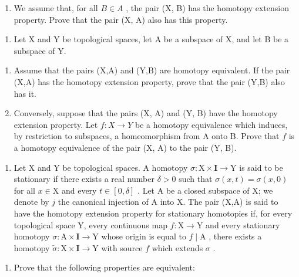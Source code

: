 \begin{enumerate}
\def\labelenumi{\alph{enumi})}
\setcounter{enumi}{1}
\tightlist
\item
  We assume that, for all \(B \in A\) , the pair (X, B) has the homotopy extension property. Prove that the pair (X, A) also has this property.
\end{enumerate}

\begin{enumerate}
\def\labelenumi{\arabic{enumi})}
\setcounter{enumi}{21}
\tightlist
\item
  Let X and Y be topological spaces, let A be a subspace of X, and let B be a subspace of Y.
\end{enumerate}

\begin{enumerate}
\def\labelenumi{\alph{enumi})}
\item
  Assume that the pairs (X,A) and (Y,B) are homotopy equivalent. If the pair (X,A) has the homotopy extension property, prove that the pair (Y,B) also has it.
\item
  Conversely, suppose that the pairs (X, A) and (Y, B) have the homotopy extension property. Let \(f \colon X \to Y\) be a homotopy equivalence which induces, by restriction to subspaces, a homeomorphism from A onto B. Prove that \(f\) is a homotopy equivalence of the pair (X, A) to the pair (Y, B).
\end{enumerate}

\begin{enumerate}
\def\labelenumi{\arabic{enumi})}
\setcounter{enumi}{22}
\tightlist
\item
  Let X and Y be topological spaces. A homotopy \(\sigma\colon\mathrm{X}\times\mathbf{I}\to\mathrm{Y}\) is said to be stationary if there exists a real number \(\delta>0\) such that \(\sigma(x,t)=\sigma(x,0)\) for all \(x\in\mathrm{X}\) and every \(t\in[0,\delta]\) . Let A be a closed subspace of X; we denote by \(j\) the canonical injection of A into X. The pair (X,A) is said to have the homotopy extension property for stationary homotopies if, for every topological space Y, every continuous map \(f\colon\mathrm{X}\to\mathrm{Y}\) and every stationary homotopy \(\sigma\colon\mathrm{A}\times\mathbf{I}\to\mathrm{Y}\) whose origin is equal to \(f\mid\mathrm{A}\) , there exists a homotopy \(\widetilde{\sigma}\colon\mathrm{X}\times\mathbf{I}\to\mathrm{Y}\) with source \(f\) which extends \(\sigma\) .
\end{enumerate}

\begin{enumerate}
\def\labelenumi{\alph{enumi})}
\tightlist
\item
  Prove that the following properties are equivalent:
\end{enumerate}

